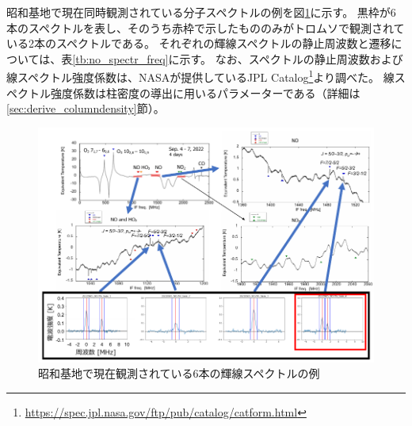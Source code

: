 昭和基地で現在同時観測されている分子スペクトルの例を図\ref{fig:NO_spectr}に示す。
黒枠が6本のスペクトルを表し、そのうち赤枠で示したもののみがトロムソで観測されている2本のスペクトルである。
それぞれの輝線スペクトルの静止周波数と遷移については、表\ref{tb:no_spectr_freq}に示す。
なお、スペクトルの静止周波数および線スペクトル強度係数は、NASAが提供しているJPL Catalog\footnote{\url{https://spec.jpl.nasa.gov/ftp/pub/catalog/catform.html}}より調べた。
線スペクトル強度係数は柱密度の導出に用いるパラメーターである（詳細は\ref{sec:derive_columndensity}節）。
\begin{figure}[htbp]
    \centering
    \includegraphics[width=\linewidth]{master_thesis_contents/master_thesis_fig/NO_spectr.pdf}
    \caption{昭和基地で現在観測されている6本の輝線スペクトルの例}
    \label{fig:NO_spectr}
\end{figure}
